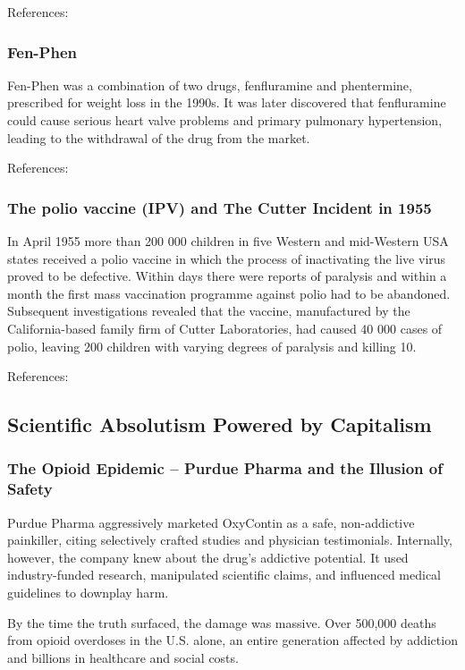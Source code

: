 References: \cite{Diethylstilbestrol2000}

\subsubsection{Fen-Phen}
Fen-Phen was a combination of two drugs, fenfluramine and phentermine, prescribed for weight loss in the 1990s. It was later discovered that fenfluramine could cause serious heart valve problems and primary
pulmonary hypertension, leading to the withdrawal of the drug from the market.

References: \cite{Wolff1997}

\subsubsection{The polio vaccine (IPV) and The Cutter Incident in 1955}

In April 1955 more than 200 000 children in five Western and mid-Western USA states received a polio vaccine in which the process of inactivating the live virus proved to be defective. Within days there were reports of paralysis and within a month the first mass vaccination programme against polio had to be abandoned. Subsequent investigations revealed that the vaccine, manufactured by the California-based family firm of Cutter Laboratories, had caused 40 000 cases of polio, leaving 200 children with varying degrees of paralysis and killing 10.

References: \cite{Fitzpatrick2006}

\subsection{Scientific Absolutism Powered by Capitalism}

\subsubsection{The Opioid Epidemic – Purdue Pharma and the Illusion of Safety}

Purdue Pharma aggressively marketed OxyContin as a safe, non-addictive painkiller, citing selectively crafted studies and physician testimonials. Internally, however, the company knew about the drug's addictive potential. It used industry-funded research, manipulated scientific claims, and influenced medical guidelines to downplay harm.

By the time the truth surfaced, the damage was massive. Over 500,000 deaths from opioid overdoses in the U.S. alone, an entire generation affected by addiction and billions in healthcare and social costs.

